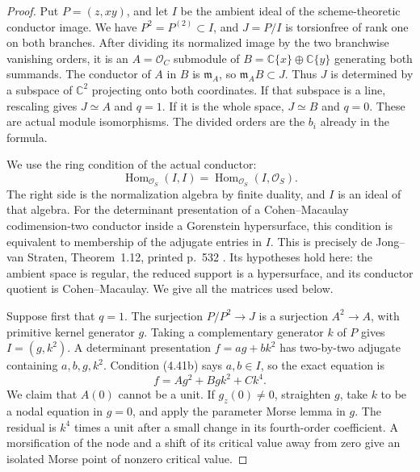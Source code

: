 \begin{proof}
Put $P=(z,xy)$, and let $I$ be the ambient ideal of the
scheme-theoretic conductor image. We have $P^2=P^{(2)}\subset I$,
and $J=P/I$ is torsionfree of rank one on both branches.
After dividing its normalized image by the two branchwise
vanishing orders, it is an $A=\mathcal O_C$ submodule of
$B=\mathbb C\{x\}\oplus\mathbb C\{y\}$ generating both
summands. The conductor of $A$ in $B$ is $\mathfrak m_A$,
so $\mathfrak m_AB\subset J$. Thus $J$ is determined by
a subspace of $\mathbb C^2$ projecting onto both coordinates.
If that subspace is a line, rescaling gives $J\simeq A$ and
$q=1$. If it is the whole space, $J\simeq B$ and $q=0$.
These are actual module isomorphisms. The divided orders are
the $b_i$ already in the formula.

We use the ring condition of the actual conductor:
\[
 \operatorname{Hom}_{\mathcal O_S}(I,I)=
 \operatorname{Hom}_{\mathcal O_S}(I,\mathcal O_S).
                                                               \tag{4.41b}
\]
The right side is the normalization algebra by finite duality,
and $I$ is an ideal of that algebra. For the determinant
presentation of a Cohen--Macaulay codimension-two conductor
inside a Gorenstein hypersurface, this condition is equivalent
to membership of the adjugate entries in $I$. This is precisely
de Jong--van Straten, Theorem~1.12, printed p.~532
\cite{DeJongVanStraten1990Normalization}. Its hypotheses hold
here: the ambient space is regular, the reduced support is a
hypersurface, and its conductor quotient is Cohen--Macaulay.
We give all the matrices used below.

Suppose first that $q=1$. The surjection
$P/P^2\to J$ is a surjection $A^2\to A$, with primitive
kernel generator $g$. Taking a complementary generator $k$
of $P$ gives $I=(g,k^2)$. A determinant presentation
$f=ag+bk^2$ has two-by-two adjugate containing $a,b,g,k^2$.
Condition (4.41b) says $a,b\in I$, so the exact equation is
\[
                   f=Ag^2+Bgk^2+Ck^4.                \tag{4.41c}
\]
We claim that $A(0)$ cannot be a unit. If $g_z(0)\ne0$,
straighten $g$, take $k$ to be a nodal equation in $g=0$,
and apply the parameter Morse lemma in $g$. The residual
is $k^4$ times a unit after a small change in its fourth-order
coefficient. A morsification of the node and a shift of its
critical value away from zero give an isolated Morse point
of nonzero critical value.


\end{proof}
